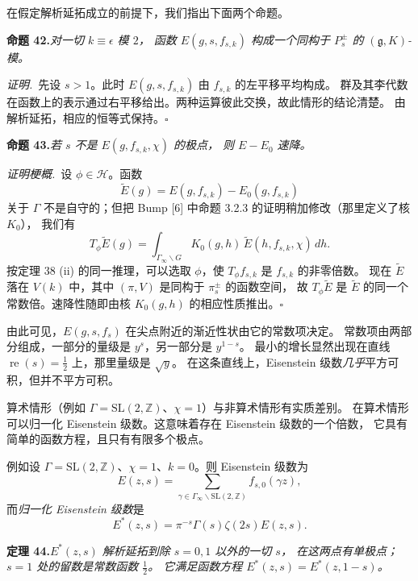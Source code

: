 在假定解析延拓成立的前提下，我们指出下面两个命题。

\par\medskip\noindent\textbf{命题 42.}\quad\emph{对一切 $k\equiv\epsilon$ 模 $2$，
函数 $E(g,s,f_{s,k})$ 构成一个同构于 $P_{s}^{\pm}$ 的 $(\mathfrak{g},K)$-模。}

\smallskip
\noindent\emph{证明.}\ 先设 $s>1$。此时 $E(g,s,f_{s,k})$ 由 $f_{s,k}$ 的左平移平均构成。
群及其李代数在函数上的表示通过右平移给出。两种运算彼此交换，故此情形的结论清楚。
由解析延拓，相应的恒等式保持。\hfill$\square$

\par\medskip\noindent\textbf{命题 43.}\quad\emph{若 $s$ 不是 $E(g,f_{s,k},\chi)$ 的极点，
则 $E-E_{0}$ 速降。}

\smallskip
\noindent\emph{证明梗概.}\ 设 $\phi\in\mathcal{H}$。函数
\[
\tilde E(g)=E(g,f_{s,k})-E_{0}(g,f_{s,k})
\]
关于 $\Gamma$ 不是自守的；但把 Bump [6] 中命题 3.2.3 的证明稍加修改（那里定义了核 $K_{0}$），
我们有
\[
T_{\phi}\tilde E(g)=\int_{\Gamma_{\infty}\backslash G}K_{0}(g,h)\,\tilde E(h,f_{s,k},\chi)\,dh .
\]
按定理 38 (ii) 的同一推理，可以选取 $\phi$，使 $T_{\phi}f_{s,k}$ 是 $f_{s,k}$ 的非零倍数。
现在 $\tilde E$ 落在 $V(k)$ 中，其中 $(\pi,V)$ 是同构于 $\pi_{s}^{\pm}$ 的函数空间，
故 $T_{\phi}\tilde E$ 是 $\tilde E$ 的同一个常数倍。速降性随即由核 $K_{0}(g,h)$
的相应性质推出。\hfill$\square$

由此可见，$E(g,s,f_{s})$ 在尖点附近的渐近性状由它的常数项决定。
常数项由两部分组成，一部分的量级是 $y^{s}$，另一部分是 $y^{1-s}$。
最小的增长显然出现在直线 $\operatorname{re}(s)=\tfrac12$ 上，那里量级是 $\sqrt{y}$。
在这条直线上，Eisenstein 级数\emph{几乎}平方可积，但并不平方可积。

算术情形（例如 $\Gamma=\mathrm{SL}(2,\mathbb{Z})$、$\chi=1$）与非算术情形有实质差别。
在算术情形可以归一化 Eisenstein 级数。这意味着存在 Eisenstein 级数的一个倍数，
它具有简单的函数方程，且只有有限多个极点。

例如设 $\Gamma=\mathrm{SL}(2,\mathbb{Z})$、$\chi=1$、$k=0$。则 Eisenstein 级数为
\[
E(z,s)=\sum_{\gamma\in\Gamma_{\infty}\backslash\mathrm{SL}(2,\mathbb{Z})}f_{s,0}(\gamma z),
\]
而\emph{归一化 Eisenstein 级数}是
\begin{equation}\tag{47}
E^{*}(z,s)=\pi^{-s}\Gamma(s)\zeta(2s)E(z,s).
\end{equation}

\par\medskip\noindent\textbf{定理 44.}\quad\emph{$E^{*}(z,s)$ 解析延拓到除 $s=0,1$ 以外的一切 $s$，
在这两点有单极点；$s=1$ 处的留数是常数函数 $\tfrac12$。
它满足函数方程 $E^{*}(z,s)=E^{*}(z,1-s)$。}

